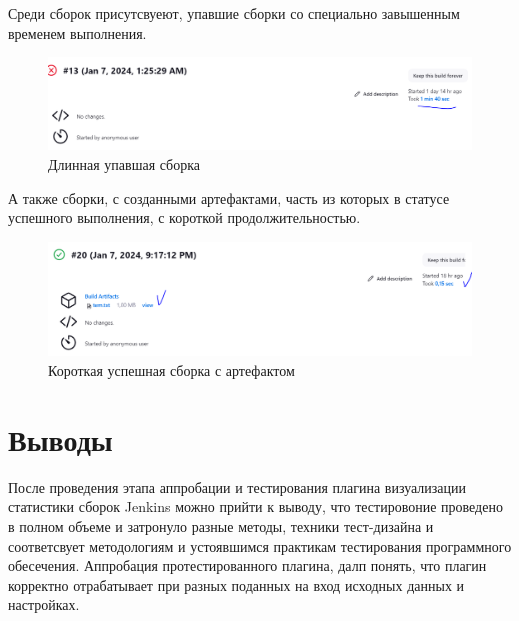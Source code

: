  Среди сборок присутсвуеют, упавшие сборки со специально завышенным временем выполнения.
 
 \begin{figure}[ht!] 
	\center
	\includegraphics [scale=0.47] {my_folder/images//longBuild}
	\caption{Длинная упавшая сборка} 
	\label{fig:longBuild}  
\end{figure}


А также сборки, с созданными артефактами, часть из которых в статусе успешного выполнения, с короткой продолжительностью.
 
 \begin{figure}[ht!] 
	\center
	\includegraphics [scale=0.47] {my_folder/images//artifactBuild}
	\caption{Короткая успешная сборка с артефактом} 
	\label{fig:artifactBuild}  
\end{figure}
 
 
\section{Выводы} \label{ch4:sec3}

После проведения этапа аппробации и тестирования плагина визуализации статистики сборок Jenkins можно прийти к выводу, что тестировоние проведено в полном объеме и затронуло разные методы, техники тест-дизайна и соответсвует методологиям и устоявшимся практикам тестирования программного обесечения. Аппробация протестированного плагина, далп понять, что плагин корректно отрабатывает при разных поданных на вход исходных данных и настройках.






%
%

